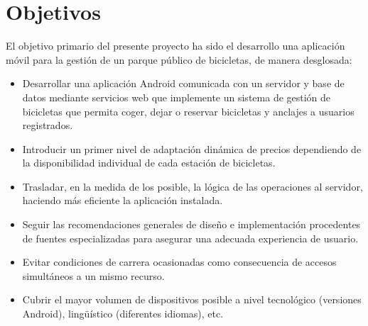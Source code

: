 \chapter{Objetivos}

El objetivo primario del presente proyecto ha sido el desarrollo una aplicación móvil para la gestión de un parque público de bicicletas, de manera desglosada:

\begin{itemize}  
	\item Desarrollar una aplicación Android comunicada con un servidor y base de datos mediante servicios web que implemente un sistema de gestión de bicicletas que permita coger, dejar o reservar bicicletas y anclajes a usuarios registrados.
	\item Introducir un primer nivel de adaptación dinámica de precios dependiendo de la disponibilidad individual de cada estación de bicicletas.
	\item Trasladar, en la medida de los posible, la lógica de las operaciones al servidor, haciendo más eficiente la aplicación instalada.
	\item Seguir las recomendaciones generales de diseño e implementación procedentes de fuentes especializadas para asegurar una adecuada experiencia de usuario.
	\item Evitar condiciones de carrera ocasionadas como consecuencia de accesos simultáneos a un mismo recurso.
	\item Cubrir el mayor volumen de dispositivos posible a nivel tecnológico (versiones Android), lingüístico (diferentes idiomas), etc.
\end{itemize}